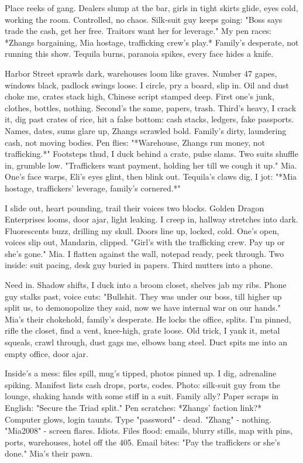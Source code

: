 \documentclass{article}
\begin{document}
Place reeks of gang. Dealers slump at the bar, girls in tight skirts glide, eyes cold, working the room. Controlled, no chaos. Silk-suit guy keeps going: "Boss says trade the cash, get her free. Traitors want her for leverage." My pen races: *Zhangs bargaining, Mia hostage, trafficking crew's play.* Family's desperate, not running this show. Tequila burns, paranoia spikes, every face hides a knife.

Harbor Street sprawls dark, warehouses loom like graves. Number 47 gapes, windows black, padlock swings loose. I circle, pry a board, slip in. Oil and dust choke me, crates stack high, Chinese script stamped deep. First one's junk, clothes, bottles, nothing. Second's the same, papers, trash. Third's heavy, I crack it, dig past crates of rice, hit a false bottom: cash stacks, ledgers, fake passports. Names, dates, sums glare up, Zhangs scrawled bold. Family's dirty, laundering cash, not moving bodies. Pen flies: "*Warehouse, Zhangs run money, not trafficking.*" Footsteps thud, I duck behind a crate, pulse slams. Two suits shuffle in, grumble low. "Traffickers want payment, holding her till we cough it up." Mia. One's face warps, Eli's eyes glint, then blink out. Tequila's claws dig, I jot: "*Mia hostage, traffickers' leverage, family's cornered.*"

I slide out, heart pounding, trail their voices two blocks. Golden Dragon Enterprises looms, door ajar, light leaking. I creep in, hallway stretches into dark. Fluorescents buzz, drilling my skull. Doors line up, locked, cold. One's open, voices slip out, Mandarin, clipped. "Girl's with the trafficking crew. Pay up or she's gone." Mia. I flatten against the wall, notepad ready, peek through. Two inside: suit pacing, desk guy buried in papers. Third mutters into a phone.

Need in. Shadow shifts, I duck into a broom closet, shelves jab my ribs. Phone guy stalks past, voice cuts: "Bullshit. They was under our boss, till higher up split us, to demonopolize they said, now we have internal war on our hands." Mia's their chokehold, family's desperate. He locks the office, splits. I'm pinned, rifle the closet, find a vent, knee-high, grate loose. Old trick, I yank it, metal squeals, crawl through, dust gags me, elbows bang steel. Duct spits me into an empty office, door ajar.

Inside's a mess: files spill, mug's tipped, photos pinned up. I dig, adrenaline spiking. Manifest lists cash drops, ports, codes. Photo: silk-suit guy from the lounge, shaking hands with some stiff in a suit. Family ally? Paper scraps in English: "Secure the Triad split." Pen scratches: *Zhangs' faction link?* Computer glows, login taunts. Type "password" - dead. "Zhang" - nothing. "Mia2008" - screen flares. Idiots. Files flood: emails, blurry stills, map with pins, ports, warehouses, hotel off the 405. Email bites: "Pay the traffickers or she's done." Mia's their pawn.
\end{document}
